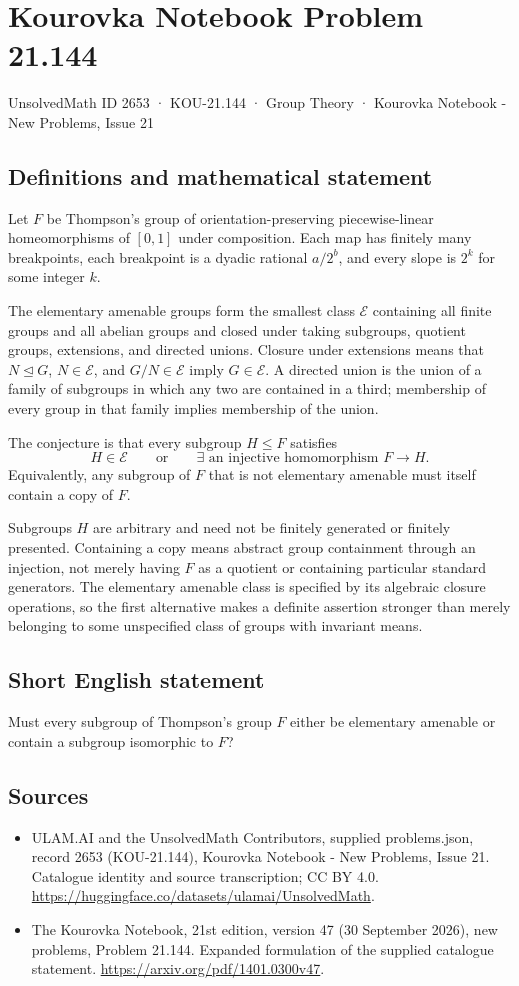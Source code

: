 \documentclass[11pt,a4paper]{article}
\begin{document}
\section*{Kourovka Notebook Problem 21.144}\label{2653}
{\small UnsolvedMath ID 2653 · KOU-21.144 · Group Theory · Kourovka Notebook - New Problems, Issue 21}
\subsection{Definitions and mathematical statement}
Let $F$ be Thompson's group of orientation-preserving piecewise-linear homeomorphisms of $[0,1]$ under composition. Each map has finitely many breakpoints, each breakpoint is a dyadic rational $a/2^b$, and every slope is $2^k$ for some integer $k$.

The elementary amenable groups form the smallest class $\mathcal E$ containing all finite groups and all abelian groups and closed under taking subgroups, quotient groups, extensions, and directed unions. Closure under extensions means that $N\trianglelefteq G$, $N\in\mathcal E$, and $G/N\in\mathcal E$ imply $G\in\mathcal E$. A directed union is the union of a family of subgroups in which any two are contained in a third; membership of every group in that family implies membership of the union.

The conjecture is that every subgroup $H\le F$ satisfies
\[
 H\in\mathcal E\qquad\text{or}\qquad
 \exists\text{ an injective homomorphism }F\longrightarrow H.
\]
Equivalently, any subgroup of $F$ that is not elementary amenable must itself contain a copy of $F$.

Subgroups $H$ are arbitrary and need not be finitely generated or finitely presented. Containing a copy means abstract group containment through an injection, not merely having $F$ as a quotient or containing particular standard generators. The elementary amenable class is specified by its algebraic closure operations, so the first alternative makes a definite assertion stronger than merely belonging to some unspecified class of groups with invariant means.
\subsection{Short English statement}
Must every subgroup of Thompson’s group $F$ either be elementary amenable or contain a subgroup isomorphic to $F$?
\subsection{Sources}
\begin{itemize}
\item[S1] ULAM.AI and the UnsolvedMath Contributors, supplied problems.json, record 2653 (KOU-21.144), Kourovka Notebook - New Problems, Issue 21. Catalogue identity and source transcription; CC BY 4.0.
\url{https://huggingface.co/datasets/ulamai/UnsolvedMath}.
\item[S2] The Kourovka Notebook, 21st edition, version 47 (30 September 2026), new problems, Problem 21.144. Expanded formulation of the supplied catalogue statement.
\url{https://arxiv.org/pdf/1401.0300v47}.
\end{itemize}
\end{document}
